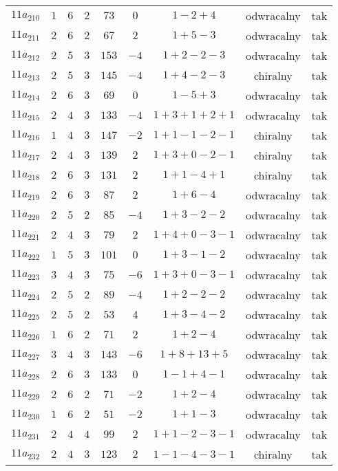 \begin{longtable}{ccccccccc}
$11a_{210}$ & $1$ & $6$ & $2$ & $73$ & $0$ & $1-2+4$ & odwracalny & tak \\
$11a_{211}$ & $2$ & $6$ & $2$ & $67$ & $2$ & $1+5-3$ & odwracalny & tak \\
$11a_{212}$ & $2$ & $5$ & $3$ & $153$ & $-4$ & $1+2-2-3$ & odwracalny & tak \\
$11a_{213}$ & $2$ & $5$ & $3$ & $145$ & $-4$ & $1+4-2-3$ & chiralny & tak \\
$11a_{214}$ & $2$ & $6$ & $3$ & $69$ & $0$ & $1-5+3$ & odwracalny & tak \\
$11a_{215}$ & $2$ & $4$ & $3$ & $133$ & $-4$ & $1+3+1+2+1$ & odwracalny & tak \\
$11a_{216}$ & $1$ & $4$ & $3$ & $147$ & $-2$ & $1+1-1-2-1$ & chiralny & tak \\
$11a_{217}$ & $2$ & $4$ & $3$ & $139$ & $2$ & $1+3+0-2-1$ & chiralny & tak \\
$11a_{218}$ & $2$ & $6$ & $3$ & $131$ & $2$ & $1+1-4+1$ & chiralny & tak \\
$11a_{219}$ & $2$ & $6$ & $3$ & $87$ & $2$ & $1+6-4$ & odwracalny & tak \\
$11a_{220}$ & $2$ & $5$ & $2$ & $85$ & $-4$ & $1+3-2-2$ & odwracalny & tak \\
$11a_{221}$ & $2$ & $4$ & $3$ & $79$ & $2$ & $1+4+0-3-1$ & odwracalny & tak \\
$11a_{222}$ & $1$ & $5$ & $3$ & $101$ & $0$ & $1+3-1-2$ & odwracalny & tak \\
$11a_{223}$ & $3$ & $4$ & $3$ & $75$ & $-6$ & $1+3+0-3-1$ & odwracalny & tak \\
$11a_{224}$ & $2$ & $5$ & $2$ & $89$ & $-4$ & $1+2-2-2$ & odwracalny & tak \\
$11a_{225}$ & $2$ & $5$ & $2$ & $53$ & $4$ & $1+3-4-2$ & odwracalny & tak \\
$11a_{226}$ & $1$ & $6$ & $2$ & $71$ & $2$ & $1+2-4$ & odwracalny & tak \\
$11a_{227}$ & $3$ & $4$ & $3$ & $143$ & $-6$ & $1+8+13+5$ & odwracalny & tak \\
$11a_{228}$ & $2$ & $6$ & $3$ & $133$ & $0$ & $1-1+4-1$ & odwracalny & tak \\
$11a_{229}$ & $2$ & $6$ & $2$ & $71$ & $-2$ & $1+2-4$ & odwracalny & tak \\
$11a_{230}$ & $1$ & $6$ & $2$ & $51$ & $-2$ & $1+1-3$ & odwracalny & tak \\
$11a_{231}$ & $2$ & $4$ & $4$ & $99$ & $2$ & $1+1-2-3-1$ & odwracalny & tak \\
$11a_{232}$ & $2$ & $4$ & $3$ & $123$ & $2$ & $1-1-4-3-1$ & chiralny & tak \\

\end{longtable}
